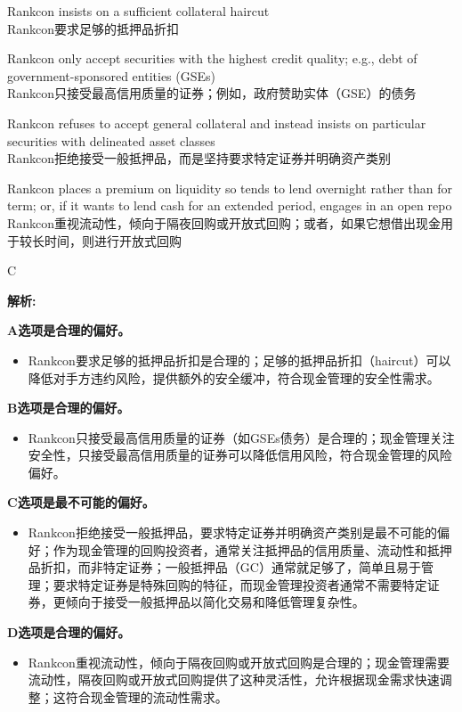 \documentclass{article}
\newenvironment{explanation}
{\textbf{解析:}\par}
{\par}
\begin{document}
\begin{choices}
    \item Rankcon insists on a sufficient collateral haircut\\
    Rankcon要求足够的抵押品折扣
    \item Rankcon only accept securities with the highest credit quality; e.g., debt of government-sponsored entities (GSEs)\\
    Rankcon只接受最高信用质量的证券；例如，政府赞助实体（GSE）的债务
    \item Rankcon refuses to accept general collateral and instead insists on particular securities with delineated asset classes\\
    Rankcon拒绝接受一般抵押品，而是坚持要求特定证券并明确资产类别
    \item Rankcon places a premium on liquidity so tends to lend overnight rather than for term; or, if it wants to lend cash for an extended period, engages in an open repo\\
    Rankcon重视流动性，倾向于隔夜回购或开放式回购；或者，如果它想借出现金用于较长时间，则进行开放式回购
\end{choices}

\begin{correctanswer}
    C
\end{correctanswer}

\begin{explanation}
    \textbf{A选项是合理的偏好。}
    \begin{itemize}
        \item Rankcon要求足够的抵押品折扣是合理的；足够的抵押品折扣（haircut）可以降低对手方违约风险，提供额外的安全缓冲，符合现金管理的安全性需求。
    \end{itemize}

    \textbf{B选项是合理的偏好。}
    \begin{itemize}
        \item Rankcon只接受最高信用质量的证券（如GSEs债务）是合理的；现金管理关注安全性，只接受最高信用质量的证券可以降低信用风险，符合现金管理的风险偏好。
    \end{itemize}

    \textbf{C选项是最不可能的偏好。}
    \begin{itemize}
        \item Rankcon拒绝接受一般抵押品，要求特定证券并明确资产类别是最不可能的偏好；作为现金管理的回购投资者，通常关注抵押品的信用质量、流动性和抵押品折扣，而非特定证券；一般抵押品（GC）通常就足够了，简单且易于管理；要求特定证券是特殊回购的特征，而现金管理投资者通常不需要特定证券，更倾向于接受一般抵押品以简化交易和降低管理复杂性。
    \end{itemize}

    \textbf{D选项是合理的偏好。}
    \begin{itemize}
        \item Rankcon重视流动性，倾向于隔夜回购或开放式回购是合理的；现金管理需要流动性，隔夜回购或开放式回购提供了这种灵活性，允许根据现金需求快速调整；这符合现金管理的流动性需求。
    \end{itemize}
\end{explanation}
\end{document}
